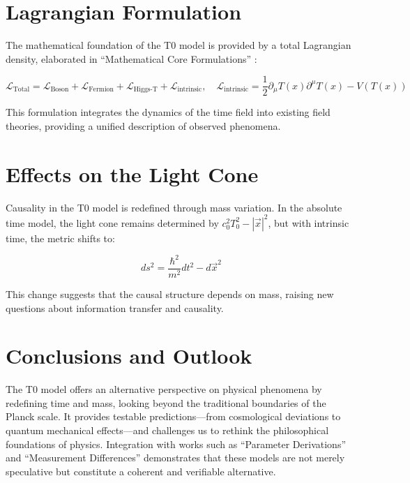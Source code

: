 \documentclass[a4paper,12pt]{article}
\newcommand{\Tfield}{T(x)}
\begin{document}
	\section{Lagrangian Formulation}
	
	The mathematical foundation of the T0 model is provided by a total Lagrangian density, elaborated in “Mathematical Core Formulations” \cite{pascher_lagrange_2025}:
	
	\begin{equation}
		\mathcal{L}_{\text{Total}} = \mathcal{L}_{\text{Boson}} + \mathcal{L}_{\text{Fermion}} + \mathcal{L}_{\text{Higgs-T}} + \mathcal{L}_{\text{intrinsic}}, \quad \mathcal{L}_{\text{intrinsic}} = \frac{1}{2} \partial_\mu \Tfield \partial^\mu \Tfield - V(\Tfield)
	\end{equation}
	
	This formulation integrates the dynamics of the time field into existing field theories, providing a unified description of observed phenomena.
	
	\section{Effects on the Light Cone}
	
	Causality in the T0 model is redefined through mass variation. In the absolute time model, the light cone remains determined by \(c_0^2 T_0^2 - |\vec{x}|^2\), but with intrinsic time, the metric shifts to:
	
	\begin{equation}
		ds^2 = \frac{\hbar^2}{m^2} dt^2 - d\vec{x}^2
	\end{equation}
	
	This change suggests that the causal structure depends on mass, raising new questions about information transfer and causality.
	
	\section{Conclusions and Outlook}
	
	The T0 model offers an alternative perspective on physical phenomena by redefining time and mass, looking beyond the traditional boundaries of the Planck scale. It provides testable predictions—from cosmological deviations to quantum mechanical effects—and challenges us to rethink the philosophical foundations of physics. Integration with works such as “Parameter Derivations” \cite{pascher_params_2025} and “Measurement Differences” \cite{pascher_messdifferenzen_2025} demonstrates that these models are not merely speculative but constitute a coherent and verifiable alternative.
	
\end{document}
